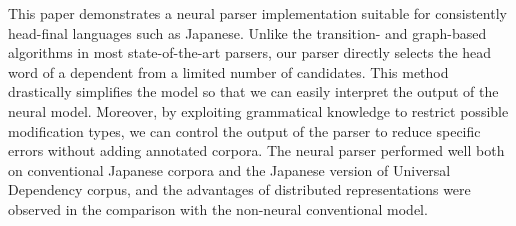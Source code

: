 This paper demonstrates a neural parser implementation suitable for consistently head-final languages such as Japanese. Unlike the transition- and graph-based algorithms in most state-of-the-art parsers, our parser directly selects the head word of a dependent from a limited number of candidates. This method drastically simplifies the model so that we can easily interpret the output of the neural model. Moreover, by exploiting grammatical knowledge to restrict possible modification types, we can control the output of the parser to reduce specific errors without adding annotated corpora. The neural parser performed well both on conventional Japanese corpora and the Japanese version of Universal Dependency corpus, and the advantages of distributed representations were observed in the comparison with the non-neural conventional model.
